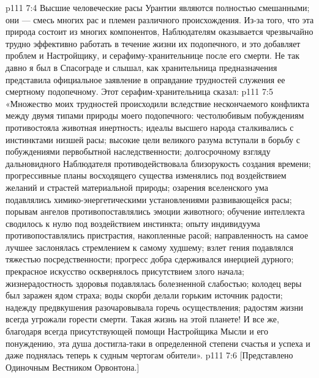 \vs p111 7:4 Высшие человеческие расы Урантии являются полностью смешанными; они --- смесь многих рас и племен различного происхождения. Из\hyp{}за того, что эта природа состоит из многих компонентов, Наблюдателям оказывается чрезвычайно трудно эффективно работать в течение жизни их подопечного, и это добавляет проблем и Настройщику, и серафиму\hyp{}хранительнице после его смерти. Не так давно я был в Спасограде и слышал, как хранительница предназначения представила официальное заявление в оправдание трудностей служения ее смертному подопечному. Этот серафим\hyp{}хранительница сказал:
\vs p111 7:5 \pc «Множество моих трудностей происходили вследствие нескончаемого конфликта между двумя типами природы моего подопечного: честолюбивым побуждениям противостояла животная инертность; идеалы высшего народа сталкивались с инстинктами низшей расы; высокие цели великого разума вступали в борьбу с побуждениями первобытной наследственности; долгосрочному взгляду дальновидного Наблюдателя противодействовала близорукость создания времени; прогрессивные планы восходящего существа изменялись под воздействием желаний и страстей материальной природы; озарения вселенского ума подавлялись химико\hyp{}энергетическими установлениями развивающейся расы; порывам ангелов противопоставлялись эмоции животного; обучение интеллекта сводилось к нулю под воздействием инстинкта; опыту индивидуума противопоставлялись пристрастия, накопленные расой; направленность на самое лучшее заслонялась стремлением к самому худшему; взлет гения подавлялся тяжестью посредственности; прогресс добра сдерживался инерцией дурного; прекрасное искусство осквернялось присутствием злого начала; жизнерадостность здоровья подавлялась болезненной слабостью; колодец веры был заражен ядом страха; воды скорби делали горьким источник радости; надежду предвкушения разочаровывала горечь осуществления; радостям жизни всегда угрожали горести смерти. Такая жизнь на этой планете! И все же, благодаря всегда присутствующей помощи Настройщика Мысли и его понуждению, эта душа достигла\hyp{}таки в определенной степени счастья и успеха и даже поднялась теперь к судным чертогам обители».
\vsetoff
\vs p111 7:6 [Представлено Одиночным Вестником Орвонтона.]
